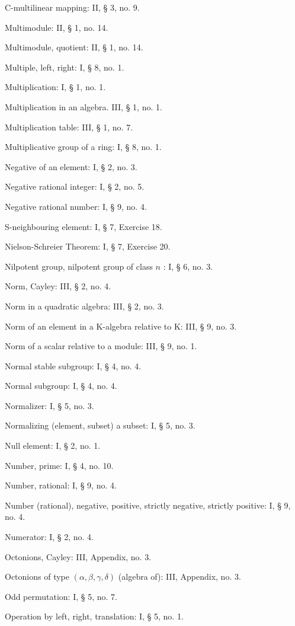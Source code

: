 C-multilinear mapping: II, § 3, no. 9.

Multimodule: II, § 1, no. 14.

Multimodule, quotient: II, § 1, no. 14.

Multiple, left, right: I, § 8, no. 1.

Multiplication: I, § 1, no. 1.

Multiplication in an algebra. III, § 1, no. 1.

Multiplication table: III, § 1, no. 7.

Multiplicative group of a ring: I, § 8, no. 1.

Negative of an element: I, § 2, no. 3.

Negative rational integer: I, § 2, no. 5.

Negative rational number: I, § 9, no. 4.

S-neighbouring element: I, § 7, Exercise 18.

Nielson-Schreier Theorem: I, § 7, Exercise 20.

Nilpotent group, nilpotent group of class \(n\) : I, § 6, no. 3.

Norm, Cayley: III, § 2, no. 4.

Norm in a quadratic algebra: III, § 2, no. 3.

Norm of an element in a K-algebra relative to K: III, § 9, no. 3.

Norm of a scalar relative to a module: III, § 9, no. 1.

Normal stable subgroup: I, § 4, no. 4.

Normal subgroup: I, § 4, no. 4.

Normalizer: I, § 5, no. 3.

Normalizing (element, subset) a subset: I, § 5, no. 3.

Null element: I, § 2, no. 1.

Number, prime: I, § 4, no. 10.

Number, rational: I, § 9, no. 4.

Number (rational), negative, positive, strictly negative, strictly positive: I, § 9, no. 4.

Numerator: I, § 2, no. 4.

Octonions, Cayley: III, Appendix, no. 3.

Octonions of type \((\alpha, \beta, \gamma, \delta)\) (algebra of): III, Appendix, no. 3.

Odd permutation: I, § 5, no. 7.

Operation by left, right, translation: I, § 5, no. 1.

